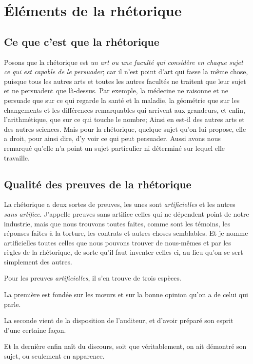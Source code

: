 
\section{Éléments de la rhétorique}

\subsection{Ce que c'est que la rhétorique}

Posons que la rhétorique est \emph{un art ou une faculté qui considère en chaque sujet ce qui est capable de le persuader}; car il n'est point d'art
qui fasse la même chose, puisque tous les autres arts et toutes les autres facultés ne traitent que leur sujet et ne persuadent que là-dessus. Par
exemple, la médecine ne raisonne et ne persuade que sur ce qui regarde la santé et la maladie, la géométrie que sur les changements et les différences
remarquables qui arrivent aux grandeurs, et enfin, l'arithmétique, que sur ce qui touche le nombre; Ainsi en est-il des autres arts et des autres
sciences. Mais pour la rhétorique, quelque sujet qu'on lui propose, elle a droit, pour ainsi dire, d'y voir ce qui peut persuader. Aussi avons nous
remarqué qu'elle n'a point un sujet particulier ni déterminé sur lequel elle travaille. 

\subsection{Qualité des preuves de la rhétorique}

La rhétorique a deux sortes de preuves, les unes sont \emph{artificielles} et les autres \emph{sans artifice}. J'appelle preuves sans artifice celles
qui ne dépendent point de notre industrie, mais que nous trouvons toutes faites, comme sont les témoins, les réponses faites à la torture, les contrats
et autres choses semblables. Et je nomme artificielles toutes celles que nous pouvons trouver de nous-mêmes et par les règles de la rhétorique, de
sorte qu'il faut inventer celles-ci, au lieu qu'on se sert simplement des autres.

Pour les preuves \emph{artificielles}, il s'en trouve de trois espèces.

La première est fondée sur les mœurs et sur la bonne opinion qu'on a de celui qui parle.

La seconde vient de la disposition de l'auditeur, et d'avoir préparé son esprit d'une certaine façon.

Et la dernière enfin naît du discours, soit que véritablement, on ait démontré son sujet, ou seulement en apparence.

